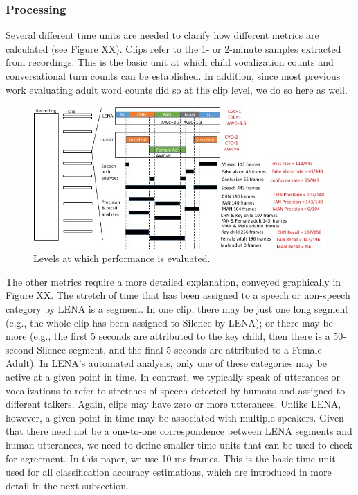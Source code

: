 \documentclass[english,floatsintext,man]{apa6}
\begin{document}
\subsubsection{Processing}\label{processing}

Several different time units are needed to clarify how different metrics
are calculated (see Figure XX). Clips refer to the 1- or 2-minute
samples extracted from recordings. This is the basic unit at which child
vocalization counts and conversational turn counts can be established.
In addition, since most previous work evaluating adult word counts did
so at the clip level, we do so here as well.

\begin{figure}
\centering
\includegraphics{fig_levels.jpg}
\caption{Levels at which performance is evaluated.}
\end{figure}

The other metrics require a more detailed explanation, conveyed
graphically in Figure XX. The stretch of time that has been assigned to
a speech or non-speech category by LENA is a segment. In one clip, there
may be just one long segment (e.g., the whole clip has been assigned to
Silence by LENA); or there may be more (e.g., the first 5 seconds are
attributed to the key child, then there is a 50-second Silence segment,
and the final 5 seconds are attributed to a Female Adult). In LENA's
automated analysis, only one of these categories may be active at a
given point in time. In contrast, we typically speak of utterances or
vocalizations to refer to stretches of speech detected by humans and
assigned to different talkers. Again, clips may have zero or more
utterances. Unlike LENA, however, a given point in time may be
associated with multiple speakers. Given that there need not be a
one-to-one correspondence between LENA segments and human utterances, we
need to define smaller time units that can be used to check for
agreement. In this paper, we use 10 ms frames. This is the basic time
unit used for all classification accuracy estimations, which are
introduced in more detail in the next subsection.
\end{document}
